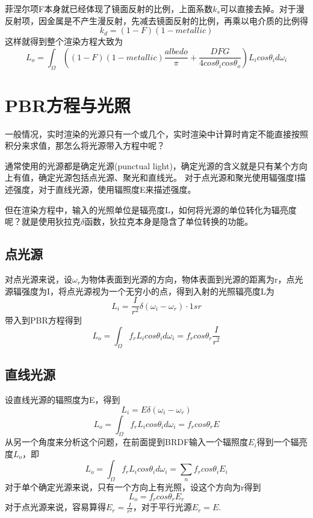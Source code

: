 菲涅尔项F本身就已经体现了镜面反射的比例，上面系数$k_{s}$可以直接去掉。对于漫反射项，因金属是不产生漫反射，先减去镜面反射的比例，再乘以电介质的比例得
$$
k_{d}=(1 - F)(1 - metallic)
$$
这样就得到整个渲染方程大致为
$$
L_{o}=\int_{\Omega}((1 - F)(1 - metallic)\frac{albedo}{\pi} + \frac{DFG}{4cos{\theta}_{i}cos{\theta}_{o}})L_{i}cos{\theta}_{i}d{\omega}_{i}
$$

\section{PBR方程与光照}
一般情况，实时渲染的光源只有一个或几个，实时渲染中计算时肯定不能直接按照积分来求值，那怎么将光源带入方程中呢？

通常使用的光源都是确定光源(punctual light)，确定光源的含义就是只有某个方向上有值，确定光源包括点光源、聚光和直线光。
对于点光源和聚光使用辐强度I描述强度，对于直线光源，使用辐照度E来描述强度。

但在渲染方程中，输入的光照单位是辐亮度L，如何将光源的单位转化为辐亮度呢？就是使用狄拉克$\delta$函数，狄拉克本身是隐含了单位转换的功能。

\subsection{点光源}
对点光源来说，设${\omega}_{r}$为物体表面到光源的方向，物体表面到光源的距离为r，点光源辐强度为I，将点光源视为一个无穷小的点，得到入射的光照辐亮度L为
$$
L_{i}=\frac{I}{r^2}{\delta}({\omega}_{i} - {\omega}_{r}) \cdot 1sr 
$$
带入到PBR方程得到
$$
L_{o}=\int_{\Omega}f_{r}L_{i}cos{\theta}_{i}d{\omega}_{i}=f_{r}cos{\theta}_{r}\frac{I}{r^2}
$$

\subsection{直线光源}
设直线光源的辐照度为E，得到
$$
L_{i}=E{\delta}({\omega}_{i} - {\omega}_{r})
$$
$$
L_{o}=\int_{\Omega}f_{r}L_{i}cos{\theta}_{i}d{\omega}_{i}=f_{r}cos{\theta}_{r}E
$$
从另一个角度来分析这个问题，在前面提到BRDF输入一个辐照度$E_{i}$得到一个辐亮度$L_{o}$，即
$$
L_{o}=\int_{\Omega}f_{r}L_{i}cos{\theta}_{i}d{\omega}_{i}=\sum_{n}f_{r}cos{\theta}_{i}E_{i}
$$
对于单个确定光源来说，只有一个方向上有光照，设这个方向为r得到
$$
L_{o}=f_{r}cos{\theta}_{r}E_{r}
$$
对于点光源来说，容易算得$E_{r}=\frac{I}{r^2}$，对于平行光源$E_{r}=E$.

